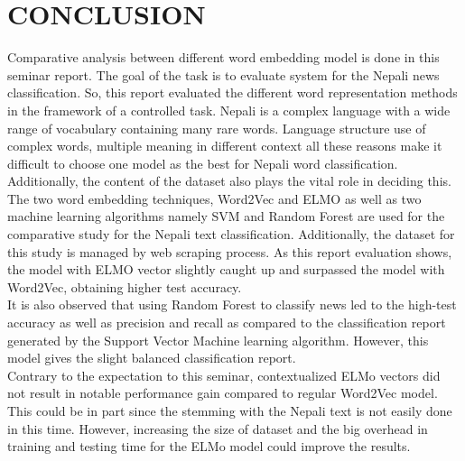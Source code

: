 \chapter{CONCLUSION}
Comparative analysis between different word embedding model is done in this seminar report. The goal of the task is to evaluate system for the Nepali news classification. So, this report evaluated the different word representation methods in the framework of a controlled task. Nepali is a complex language with a wide range of vocabulary containing many rare words.
Language structure use of complex words, multiple meaning in different context all these reasons make it difficult to choose one model as the best for Nepali word classification. Additionally, the content of the dataset also plays the vital role in deciding this.\\
The two word embedding techniques, Word2Vec and ELMO as well as two machine learning algorithms namely SVM and Random Forest are used for the comparative study for the Nepali text classification. Additionally, the dataset for this study is managed by web scraping process. As this report evaluation shows, the model with ELMO vector slightly caught up and surpassed the model with Word2Vec, obtaining higher test accuracy.\\
It is also observed that using Random Forest to classify news led to the high-test accuracy as well as precision and recall as compared to the classification report generated by the Support Vector Machine learning algorithm. However, this model gives the slight balanced classification report.\\
Contrary to the expectation to this seminar, contextualized ELMo vectors did not result in notable performance gain compared to regular Word2Vec model. This could be in part since the stemming with the Nepali text is not easily done in this time. However, increasing the size of dataset and the big overhead in training and testing time for the ELMo model could improve the results.



